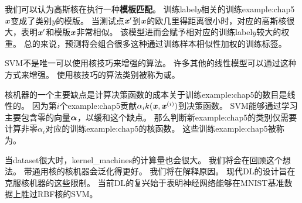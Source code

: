 我们可以认为高斯核在执行一种\textbf{模板匹配}。
训练\gls{label}$y$相关的训练\gls{example:chap5}$\boldsymbol{\mathit{x}}$变成了类别$y$的模版。
当测试点$\boldsymbol{\mathit{x}}'$到$\boldsymbol{\mathit{x}}$的欧几里得距离很小时，对应的高斯核很大，表明$\boldsymbol{\mathit{x}}'$和模版$\boldsymbol{\mathit{x}}$非常相似。
该模型进而会赋予相对应的训练\gls{label}$y$较大的权重。
总的来说，预测将会组合很多这种通过训练样本相似性加权的训练标签。

\gls{SVM}不是唯一可以使用核技巧来增强的算法。
许多其他的线性模型可以通过这种方式来增强。
使用核技巧的算法类别被称为或\citep{Williams+Rasmussen-nips8,Scholkopf99}。    

核机器的一个主要缺点是计算决策函数的成本关于训练\gls{example:chap5}的数目是线性的。
因为第$i$个\gls{example:chap5}贡献$\alpha_i k(\boldsymbol{\mathit{x}}, \boldsymbol{\mathit{x}}^{(i)})$到决策函数。
\gls{SVM}能够通过学习主要包含零的向量$\boldsymbol{\alpha}$，以缓和这个缺点。
那么判断新\gls{example:chap5}的类别仅需要计算非零$\alpha_i$对应的训练\gls{example:chap5}的核函数。
这些训练\gls{example:chap5}被称为。

当\gls{dataset}很大时，\gls{kernel_machines}的计算量也会很大。
我们将会在回顾这个想法。
带通用核的核机器会泛化得更好。
我们将在解释原因。
现代\gls{DL}的设计旨在克服核机器的这些限制。
当前\gls{DL}的复兴始于\cite{Hinton06-small}表明神经网络能够在MNIST基准数据上胜过RBF核的\gls{SVM}。


